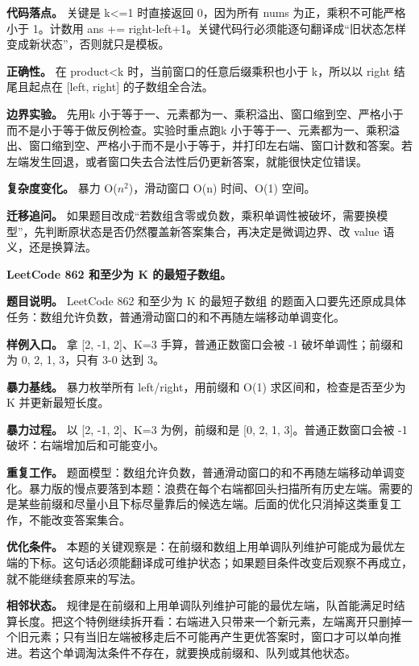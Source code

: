 \textbf{代码落点。} 关键是 k<=1 时直接返回 0，因为所有 nums 为正，乘积不可能严格小于 1。计数用 ans += right-left+1。关键代码行必须能逐句翻译成“旧状态怎样变成新状态”，否则就只是模板。

\textbf{正确性。} 在 product<k 时，当前窗口的任意后缀乘积也小于 k，所以以 right 结尾且起点在 [left, right] 的子数组全合法。

\textbf{边界实验。} 先用k 小于等于一、元素都为一、乘积溢出、窗口缩到空、严格小于而不是小于等于做反例检查。实验时重点跑k 小于等于一、元素都为一、乘积溢出、窗口缩到空、严格小于而不是小于等于，并打印左右端、窗口计数和答案。若左端发生回退，或者窗口失去合法性后仍更新答案，就能很快定位错误。

\textbf{复杂度变化。} 暴力 O(\ensuremath{n^{2}})，滑动窗口 O(n) 时间、O(1) 空间。

\textbf{迁移追问。} 如果题目改成“若数组含零或负数，乘积单调性被破坏，需要换模型”，先判断原状态是否仍然覆盖新答案集合，再决定是微调边界、改 value 语义，还是换算法。

\noindent\textbf{LeetCode 862 和至少为 K 的最短子数组。}

\textbf{题目说明。} LeetCode 862 和至少为 K 的最短子数组 的题面入口要先还原成具体任务：数组允许负数，普通滑动窗口的和不再随左端移动单调变化。

\textbf{样例入口。} 拿 [2, -1, 2]、K=3 手算，普通正数窗口会被 -1 破坏单调性；前缀和为 0, 2, 1, 3，只有 3-0 达到 3。

\textbf{暴力基线。} 暴力枚举所有 left/right，用前缀和 O(1) 求区间和，检查是否至少为 K 并更新最短长度。

\textbf{暴力过程。} 以 [2, -1, 2]、K=3 为例，前缀和是 [0, 2, 1, 3]。普通正数窗口会被 -1 破坏：右端增加后和可能变小。

\textbf{重复工作。} 题面模型：数组允许负数，普通滑动窗口的和不再随左端移动单调变化。暴力版的慢点要落到本题：浪费在每个右端都回头扫描所有历史左端。需要的是某些前缀和尽量小且下标尽量靠后的候选左端。后面的优化只消掉这类重复工作，不能改变答案集合。

\textbf{优化条件。} 本题的关键观察是：在前缀和数组上用单调队列维护可能成为最优左端的下标。这句话必须能翻译成可维护状态；如果题目条件改变后观察不再成立，就不能继续套原来的写法。

\textbf{相邻状态。} 规律是在前缀和上用单调队列维护可能的最优左端，队首能满足时结算长度。把这个特例继续拆开看：右端进入只带来一个新元素，左端离开只删掉一个旧元素；只有当旧左端被移走后不可能再产生更优答案时，窗口才可以单向推进。若这个单调淘汰条件不存在，就要换成前缀和、队列或其他状态。

